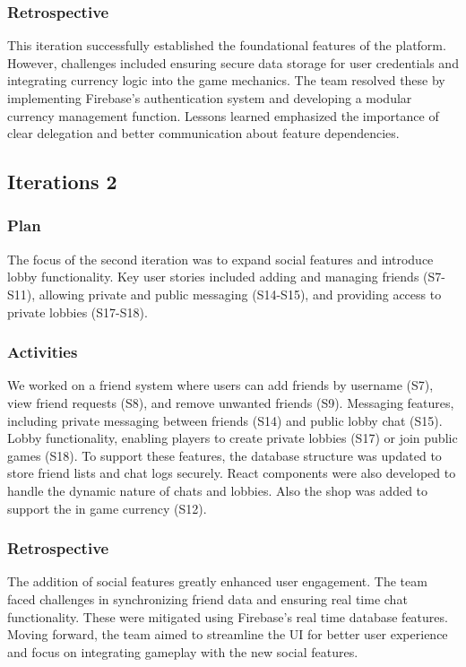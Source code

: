 \subsubsection{Retrospective}
This iteration successfully established the foundational features of the platform. However, challenges included ensuring secure data storage for user credentials and integrating currency logic into the game mechanics. The team resolved these by implementing Firebase's authentication system and developing a modular currency management function. Lessons learned emphasized the importance of clear delegation and better communication about feature dependencies.

\subsection{Iterations 2}

\subsubsection{Plan}
The focus of the second iteration was to expand social features and introduce lobby functionality. Key user stories included adding and managing friends (S7-S11), allowing private and public messaging (S14-S15), and providing access to private lobbies (S17-S18).

\subsubsection{Activities}
We worked on a friend system where users can add friends by username (S7), view friend requests (S8), and remove unwanted friends (S9).
Messaging features, including private messaging between friends (S14) and public lobby chat (S15). Lobby functionality, enabling players to create private lobbies (S17) or join public games (S18). To support these features, the database structure was updated to store friend lists and chat logs securely. React components were also developed to handle the dynamic nature of chats and lobbies. Also the shop was added to support the in game currency (S12).

\subsubsection{Retrospective}
The addition of social features greatly enhanced user engagement. The team faced challenges in synchronizing friend data and ensuring real time chat functionality. These were mitigated using Firebase’s real time database features. Moving forward, the team aimed to streamline the UI for better user experience and focus on integrating gameplay with the new social features.

